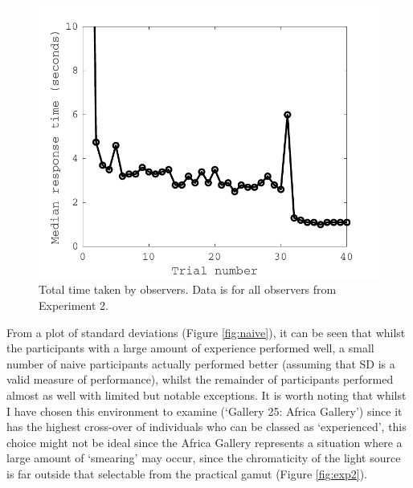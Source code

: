 \begin{figure}[hbtp]
\includegraphics[max width=\textwidth]{figs/tablet/mediantime.pdf} 
\caption{Total time taken by observers. Data is for all observers from Experiment 2. }
\label{fig:timeHistogram}
\end{figure}

From a plot of standard deviations (Figure \ref{fig:naive}), it can be seen that whilst the participants with a large amount of experience performed well, a small number of naive participants actually performed better (assuming that SD is a valid measure of performance), whilst the remainder of participants performed almost as well with limited but notable exceptions. It is worth noting that whilst I have chosen this environment to examine (`Gallery 25: Africa Gallery') since it has the highest cross-over of individuals who can be classed as `experienced', this choice might not be ideal since the Africa Gallery represents a situation where a large amount of `smearing' may occur, since the chromaticity of the light source is far outside that selectable from the practical gamut (Figure \ref{fig:exp2}). 

